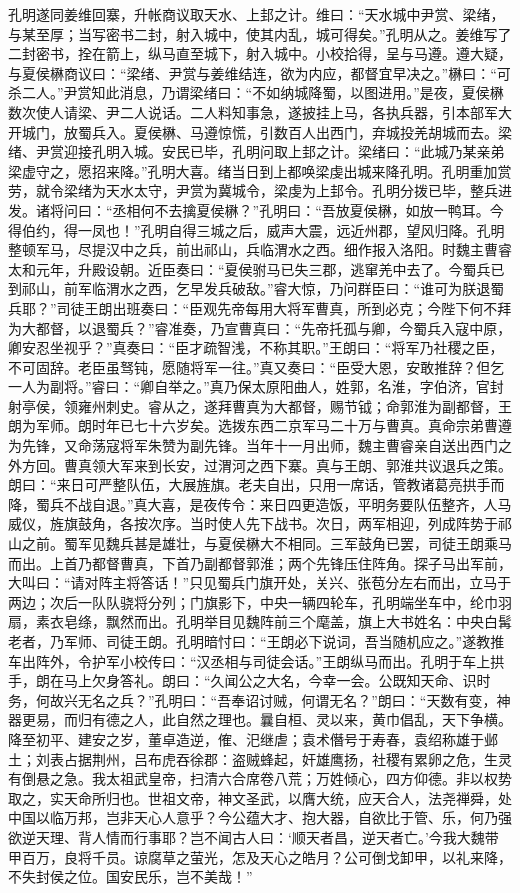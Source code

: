 孔明遂同姜维回寨，升帐商议取天水、上邽之计。维曰：“天水城中尹赏、梁绪，与某至厚；当写密书二封，射入城中，使其内乱，城可得矣。”孔明从之。姜维写了二封密书，拴在箭上，纵马直至城下，射入城中。小校拾得，呈与马遵。遵大疑，与夏侯楙商议曰：“梁绪、尹赏与姜维结连，欲为内应，都督宜早决之。”楙曰：“可杀二人。”尹赏知此消息，乃谓梁绪曰：“不如纳城降蜀，以图进用。”是夜，夏侯楙数次使人请梁、尹二人说话。二人料知事急，遂披挂上马，各执兵器，引本部军大开城门，放蜀兵入。夏侯楙、马遵惊慌，引数百人出西门，弃城投羌胡城而去。梁绪、尹赏迎接孔明入城。安民已毕，孔明问取上邽之计。梁绪曰：“此城乃某亲弟梁虚守之，愿招来降。”孔明大喜。绪当日到上都唤梁虔出城来降孔明。孔明重加赏劳，就令梁绪为天水太守，尹赏为冀城令，梁虔为上邽令。孔明分拨已毕，整兵进发。诸将问曰：“丞相何不去擒夏侯楙？”孔明曰：“吾放夏侯楙，如放一鸭耳。今得伯约，得一凤也！”孔明自得三城之后，威声大震，远近州郡，望风归降。孔明整顿军马，尽提汉中之兵，前出祁山，兵临渭水之西。细作报入洛阳。时魏主曹睿太和元年，升殿设朝。近臣奏曰：“夏侯驸马已失三郡，逃窜羌中去了。今蜀兵已到祁山，前军临渭水之西，乞早发兵破敌。”睿大惊，乃问群臣曰：“谁可为朕退蜀兵耶？”司徒王朗出班奏曰：“臣观先帝每用大将军曹真，所到必克；今陛下何不拜为大都督，以退蜀兵？”睿准奏，乃宣曹真曰：“先帝托孤与卿，今蜀兵入寇中原，卿安忍坐视乎？”真奏曰：“臣才疏智浅，不称其职。”王朗曰：“将军乃社稷之臣，不可固辞。老臣虽驽钝，愿随将军一往。”真又奏曰：“臣受大恩，安敢推辞？但乞一人为副将。”睿曰：“卿自举之。”真乃保太原阳曲人，姓郭，名淮，字伯济，官封射亭侯，领雍州刺史。睿从之，遂拜曹真为大都督，赐节钺；命郭淮为副都督，王朗为军师。朗时年已七十六岁矣。选拨东西二京军马二十万与曹真。真命宗弟曹遵为先锋，又命荡寇将军朱赞为副先锋。当年十一月出师，魏主曹睿亲自送出西门之外方回。曹真领大军来到长安，过渭河之西下寨。真与王朗、郭淮共议退兵之策。朗曰：“来日可严整队伍，大展旌旗。老夫自出，只用一席话，管教诸葛亮拱手而降，蜀兵不战自退。”真大喜，是夜传令：来日四更造饭，平明务要队伍整齐，人马威仪，旌旗鼓角，各按次序。当时使人先下战书。次日，两军相迎，列成阵势于祁山之前。蜀军见魏兵甚是雄壮，与夏侯楙大不相同。三军鼓角已罢，司徒王朗乘马而出。上首乃都督曹真，下首乃副都督郭淮；两个先锋压住阵角。探子马出军前，大叫曰：“请对阵主将答话！”只见蜀兵门旗开处，关兴、张苞分左右而出，立马于两边；次后一队队骁将分列；门旗影下，中央一辆四轮车，孔明端坐车中，纶巾羽扇，素衣皂绦，飘然而出。孔明举目见魏阵前三个麾盖，旗上大书姓名：中央白髯老者，乃军师、司徒王朗。孔明暗忖曰：“王朗必下说词，吾当随机应之。”遂教推车出阵外，令护军小校传曰：“汉丞相与司徒会话。”王朗纵马而出。孔明于车上拱手，朗在马上欠身答礼。朗曰：“久闻公之大名，今幸一会。公既知天命、识时务，何故兴无名之兵？”孔明曰：“吾奉诏讨贼，何谓无名？”朗曰：“天数有变，神器更易，而归有德之人，此自然之理也。曩自桓、灵以来，黄巾倡乱，天下争横。降至初平、建安之岁，董卓造逆，傕、汜继虐；袁术僭号于寿春，袁绍称雄于邺土；刘表占据荆州，吕布虎吞徐郡：盗贼蜂起，奸雄鹰扬，社稷有累卵之危，生灵有倒悬之急。我太祖武皇帝，扫清六合席卷八荒；万姓倾心，四方仰德。非以权势取之，实天命所归也。世祖文帝，神文圣武，以膺大统，应天合人，法尧禅舜，处中国以临万邦，岂非天心人意乎？今公蕴大才、抱大器，自欲比于管、乐，何乃强欲逆天理、背人情而行事耶？岂不闻古人曰：‘顺天者昌，逆天者亡。’今我大魏带甲百万，良将千员。谅腐草之萤光，怎及天心之皓月？公可倒戈卸甲，以礼来降，不失封侯之位。国安民乐，岂不美哉！”

